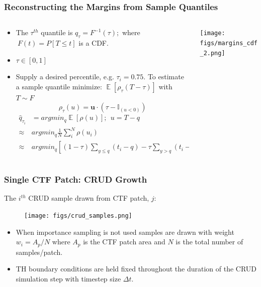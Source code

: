 \documentclass[t, pdftex]{beamer}
\DeclareMathOperator*{\E}{\mathbb{E}}
\begin{document}
\begin{frame}[shrink=20]
\frametitle{Reconstructing the Margins from Sample Quantiles}
\begin{columns}
\begin{column}{0.5\textwidth}
\begin{itemize}
\item The $\tau^{th}$ quantile is $q_\tau = F^{-1}(\tau); $ where $\ F(t)=P[T \leq t]$ is a CDF.
\item $\tau \in [0, 1]$
\item Supply a desired percentile, e.g. $\tau_i = 0.75$.
To estimate a sample quantile minimize: $\E[\rho_\tau(T - \tau)]$ with $T \sim F$
\[
\rho_\tau( u) = \mathbf u \cdot (\tau - \mathbb{I}_{( u < 0)})
\]
\begin{equation}
\left.\begin{aligned}
\hat q_{\tau_i} &= argmin_{q} \E[\rho(u)];\ \  u = T - q  \\
\approx & argmin_q  \frac{1}{N} \sum_i^N \rho(u_i) \\
\approx & argmin_q \left[ (1-\tau) \sum_{y \leq q}( t_i - q ) - \tau \sum_{y > q} (t_i - q) \right]
\end{aligned}\right. \nonumber
\end{equation}
\end{itemize}
\end{column}
\begin{column}{0.5\textwidth}  %
    \begin{center}
     \texttt{[image: figs/margins\_cdf\_2.png]}
     \end{center}
\end{column}
\end{columns}
\end{frame}


\begin{frame}
\frametitle{Single CTF Patch: CRUD Growth}
The $i^{th}$ CRUD sample drawn from CTF patch, $j$:
\begin{figure}[!htbp]
\centering
\texttt{[image: figs/crud\_samples.png]}
\label{model_overview}
\end{figure}
\begin{itemize}
\item When importance sampling is not used samples are drawn with weight $w_i=A_p/N$ where $A_p$ is the CTF patch area and $N$ is the total number of samples/patch.
\item TH boundary conditions are held fixed throughout the duration of the CRUD simulation step with timestep size $\Delta t$.
\end{itemize}
\end{frame}
\end{document}
